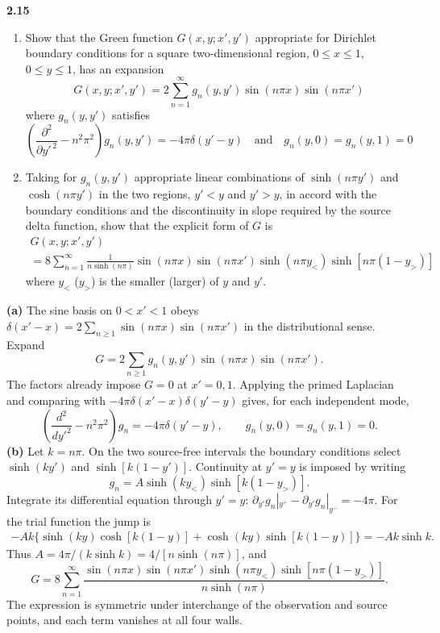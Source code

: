 \par\bigskip
\noindent\textbf{2.15}\quad\begin{enumerate}
\item[(a)] Show that the Green function $G(x,y;x',y')$ appropriate for Dirichlet boundary conditions for a square two-dimensional region, $0\leq x\leq1$, $0\leq y\leq1$, has an expansion
\[
G(x,y;x',y')=2\sum_{n=1}^{\infty}g_{n}(y,y')\sin(n\pi x)\sin(n\pi x')
\]
where $g_{n}(y,y')$ satisfies
\[
\left(\frac{\partial^{2}}{\partial y'^{\,2}}-n^{2}\pi^{2}\right)g_{n}(y,y')=-4\pi\delta(y'-y)\quad\text{and}\quad g_{n}(y,0)=g_{n}(y,1)=0
\]
\item[(b)] Taking for $g_{n}(y,y')$ appropriate linear combinations of $\sinh(n\pi y')$ and $\cosh(n\pi y')$ in the two regions, $y'<y$ and $y'>y$, in accord with the boundary conditions and the discontinuity in slope required by the source delta function, show that the explicit form of $G$ is
\begin{multline*}
G(x,y;x',y')\\
=8\sum_{n=1}^{\infty}\frac{1}{n\sinh(n\pi)}\sin(n\pi x)\sin(n\pi x')\sinh(n\pi y_{<})\sinh[n\pi(1-y_{>})]
\end{multline*}
where $y_{<}$ ($y_{>}$) is the smaller (larger) of $y$ and $y'$.
\end{enumerate}
\solution
\textbf{(a)} The sine basis on $0<x'<1$ obeys
$\delta(x'-x)=2\sum_{n\geq1}\sin(n\pi x)\sin(n\pi x')$ in the
distributional sense. Expand
\[
G=2\sum_{n\geq1}g_n(y,y')\sin(n\pi x)\sin(n\pi x').
\]
The factors already impose $G=0$ at $x'=0,1$. Applying the primed
Laplacian and comparing with
$-4\pi\delta(x'-x)\delta(y'-y)$ gives, for each independent mode,
\[
\left(\frac{d^2}{dy'^2}-n^2\pi^2\right)g_n
=-4\pi\delta(y'-y),\qquad g_n(y,0)=g_n(y,1)=0.
\]
\textbf{(b)} Let $k=n\pi$. On the two source-free intervals the
boundary conditions select $\sinh(ky')$ and $\sinh[k(1-y')]$.
Continuity at $y'=y$ is imposed by writing
\[
g_n=A\sinh(ky_<)\sinh[k(1-y_>)].
\]
Integrate its differential equation through $y'=y$:
$\partial_{y'}g_n|_{y^+}-\partial_{y'}g_n|_{y^-}=-4\pi$.
For the trial function the jump is
\begin{align*}
-Ak\{\sinh(ky)\cosh[k(1-y)]
 +\cosh(ky)\sinh[k(1-y)]\}
=-Ak\sinh k.
\end{align*}
Thus $A=4\pi/(k\sinh k)=4/[n\sinh(n\pi)]$, and
\[
\boxed{G=8\sum_{n=1}^\infty
 \frac{\sin(n\pi x)\sin(n\pi x')\sinh(n\pi y_<)
       \sinh[n\pi(1-y_>)]}{n\sinh(n\pi)}.}
\]
The expression is symmetric under interchange of the observation
and source points, and each term vanishes at all four walls.

